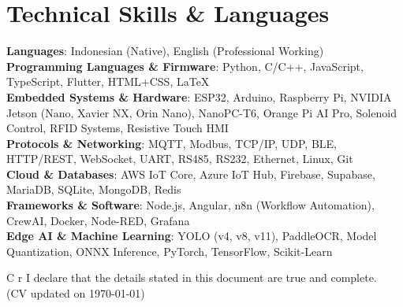 \documentclass[a4paper,11pt]{article}
\begin{document}
\section{\textbf{Technical Skills \& Languages}}
 \begin{itemize}[leftmargin=0.05in, label={}]
    \small{\item{
    \textbf{Languages}{: Indonesian (Native), English (Professional Working)} \\
    \textbf{Programming Languages \& Firmware}{: Python, C/C++, JavaScript, TypeScript, Flutter, HTML+CSS, LaTeX} \\
    \textbf{Embedded Systems \& Hardware}{: ESP32, Arduino, Raspberry Pi, NVIDIA Jetson (Nano, Xavier NX, Orin Nano), NanoPC-T6, Orange Pi AI Pro, Solenoid Control, RFID Systems, Resistive Touch HMI} \\
    \textbf{Protocols \& Networking}{: MQTT, Modbus, TCP/IP, UDP, BLE, HTTP/REST, WebSocket, UART, RS485, RS232, Ethernet, Linux, Git} \\
    \textbf{Cloud \& Databases}{: AWS IoT Core, Azure IoT Hub, Firebase, Supabase, MariaDB, SQLite, MongoDB, Redis} \\
    \textbf{Frameworks \& Software}{: Node.js, Angular, n8n (Workflow Automation), CrewAI, Docker, Node-RED, Grafana} \\
    \textbf{Edge AI \& Machine Learning}{: YOLO (v4, v8, v11), PaddleOCR, Model Quantization, ONNX Inference, PyTorch, TensorFlow, Scikit-Learn} \\
    }}
 \end{itemize}
 \vspace{-2.5mm}

\vfill
{
\begin{center}
\begin{tabularx}{\linewidth}{C r} %
  I declare that the details stated in this document are true and complete. \\
  (CV updated on \today)
\end{tabularx}
\end{center}

}

\end{document}
